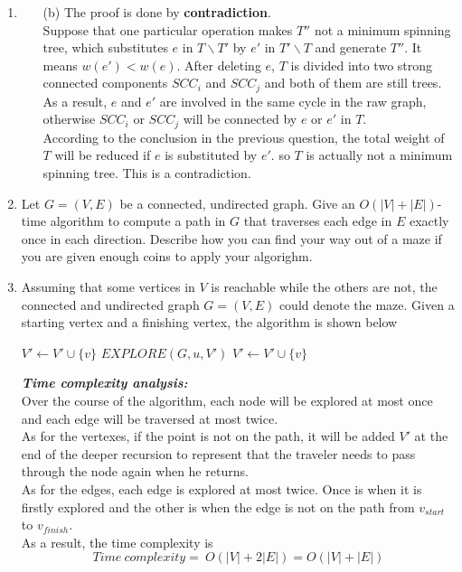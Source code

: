 \documentclass[12pt,a4paper]{article}
\makeatletter
\newtheorem*{solution}{Solution}
\theoremstyle{definition}
\renewenvironment{solution}[1][Solution] {\par\pushQED{\qed}\normalfont\topsep6\p@\@plus6\p@\relax\trivlist\item[\hskip\labelsep\bfseries#1\@addpunct{.}]\ignorespaces}{\popQED\endtrivlist\@endpefalse} \makeatother
\makeatother
\begin{document}
\begin{enumerate}
\begin{solution}
\begin{enumerate}
	   \item [(b)] The proof is done by \textbf{contradiction}. 
	   \\
	   Suppose that one particular operation makes $T''$ not a minimum spinning tree, which substitutes $e$ in $T\backslash T'$ by $e'$ in $T'\backslash T$ and generate $T''$. It means $w(e')<w(e)$. After deleting $e$, $T$ is divided into two strong connected components $SCC_i$ and $SCC_j$ and both of them are still trees. As a result, $e$ and $e'$ are involved in the same cycle in the raw graph, otherwise $SCC_i$ or $SCC_j$ will be connected by $e$ or $e'$ in $T$. 
	   \\
	   According to the conclusion in the previous question, the total weight of $T$ will be reduced if $e$ is substituted by $e'$. so $T$ is actually not a minimum spinning tree. This is a contradiction.
	  
	    
	\end{enumerate}
	\end{solution}
	    \item Let $G=(V,E)$ be a connected, undirected graph. Give an $O(|V|+|E|)$-time algorithm
    to compute a path in $G$ that traverses each edge in $E$ exactly once in each direction. Describe how you can find your way out of a maze if you are given enough coins to apply your algorighm.
    \begin{solution}
    Assuming that some vertices in $V$ is reachable while the others are not, the connected and undirected graph $G=(V,E)$ could denote the maze. Given a starting vertex and a finishing vertex, the algorithm is shown below 
    \\
        \begin{algorithm}[H]
		
		\BlankLine
		\caption{$EXPLORE(G,v,V')$}\label{Alg-maze}

        $V'\leftarrow V'\cup \{v\}$\;
        \BlankLine
		{
		}
		\BlankLine
		{
		    {
		       $EXPLORE(G,u,V')$\;
		       $V'\leftarrow V'\cup \{v\}$\;
	    	}
		}
		\end{algorithm}
		
		\textbf{\textit{Time complexity analysis:}} 
		\\
		Over the course of the algorithm, each node will be explored at most once and each edge will be traversed at most twice. 
		\\
		As for the vertexes, if the point is not on the path, it will be added $V'$ at the end of the deeper recursion to represent that the traveler needs to pass through the node again when he returns.
		\\
		As for the edges, each edge is explored at most twice. Once is when it is firstly explored and the other is when the edge is not on the path from $v_{start}$ to $v_{finish}$. 
		\\
		As a result, the time complexity is 
		$$Time\ complexity=\ O(|V|+2|E|)=O(|V|+|E|)$$


\end{solution}
\end{enumerate}
\end{document}
